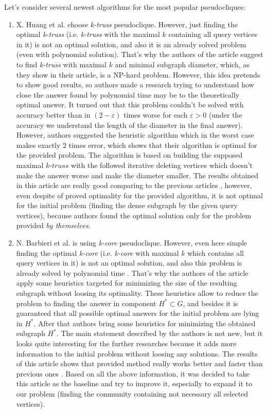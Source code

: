 Let's consider several newest algorithms for the most popular pseudocliques:

\begin{enumerate}
  \item X. Huang et al. \cite{Huang15} choose \textit{k-truss} pseudoclique. However, just finding the optimal \textit{k-truss} (i.e. \textit{k-truss} with the maximal $k$ containing all query vertices in it) is not an optimal solution, and also it is an already solved problem (even with polynomial solution). That's why the authors of the article suggest to find \textit{k-truss} with maximal $k$ and minimal subgraph diameter, which, as they show in their article, is a NP-hard problem. However, this idea pretends to show good results, so authors made a research trying to understand how close the answer found by polynomial time may be to the theoretically optimal answer. It turned out that this problem couldn't be solved with accuracy better than in $(2 - \varepsilon)$ times worse for each $\varepsilon > 0$ (under the accuracy we understand the length of the diameter in the final answer). However, authors suggested the heuristic algorithm which in the worst case makes exactly $2$ times error, which shows that their algorithm is optimal for the provided problem. The algorithm is based on building the supposed maximal $\textit{k-truss}$ with the followed iterative deleting vertices which doesn't make the answer worse and make the diameter smaller. The results obtained in this article are really good comparing to the previous articles \cite{Sozio10, Wu15}, however, even despite of proved optimality for the provided algorithm, it is not optimal for the initial problem (finding the dense subgraph by the given query vertices), because authors found the optimal solution only for the problem provided \textit{by themselves}.

  
  \item N. Barbieri et al. \cite{Barbieri15} is using \textit{k-core} pseudoclique. However, even here simple finding the optimal \textit{k-core} (i.e. \textit{k-core} with maximal $k$ which contains all query vertices in it) is not an optimal solution, and also this problem is already solved by polynomial time \cite{Sozio10}. That's why the authors of the article apply some heuristics targeted for minimizing the size of the resulting subgraph without loosing its optimality. These heuristics allow to reduce the problem to finding the answer in component $H^* \subset G$, and besides it is guaranteed that all possible optimal answers for the initial problem are lying in $H^*$. After that authors bring some heuristics for minimizing the obtained subgraph $H^*$. The main statement described by the authors is not new, but it looks quite interesting for the further researches because it adds more information to the initial problem without loosing any solutions. The results of this article shows that provided method really works better and faster than previous ones \cite{Sozio10, Cui14}. Based on all the above information, it was decided to take this article as the baseline and try to improve it, especially to expand it to our problem (finding the community containing not necessary all selected vertices).
\end{enumerate}

